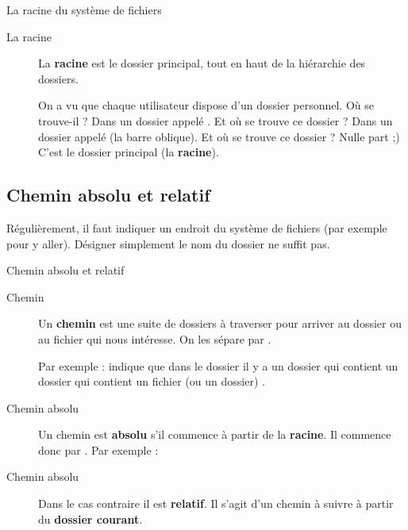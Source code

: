 \documentclass[a4paper,11pt]{style-esi/td}
\begin{document}
		\begin{theorie}{La racine du système de fichiers}
			\begin{description}
			\item[La racine]
				La \textbf{racine} est le dossier principal, 
				tout en haut de la hiérarchie des dossiers.

				On a vu que chaque utilisateur dispose d'un dossier personnel. 
				Où se trouve-il ? Dans un dossier appelé . 
				Et où se trouve ce dossier  ? 
				Dans un dossier appelé \og{}\samp{/}\fg{} (la barre oblique). 
				Et où se trouve ce dossier \og{}\samp{/}\fg{} ? Nulle part ;) 
				C'est le dossier principal (la \textbf{racine}).
			\end{description}
		\end{theorie}

	\subsection{Chemin absolu et relatif}

		
		\bigskip
		Régulièrement, il faut indiquer un endroit du système de fichiers 
		(par exemple pour y aller). 
		Désigner simplement le nom du dossier ne suffit pas.  

		\begin{theorie}{Chemin absolu et relatif}
			\begin{description}
			\item[Chemin]
				Un \textbf{chemin} est une suite de dossiers à traverser 
				pour arriver au dossier ou au fichier qui nous intéresse.
				On les sépare par \og{}\samp{/}\fg{}.

				Par exemple : 
				indique que dans le dossier 
				il y a un dossier 
				qui contient un dossier  
				qui contient un fichier (ou un dossier) .
			\item[Chemin absolu]
				Un chemin est \textbf{absolu} 
				s'il commence à partir de la \textbf{racine}.
				Il commence donc par \og{}\samp{/}\fg{}.
				Par exemple : 
			\item[Chemin absolu]
				Dans le cas contraire il est \textbf{relatif}.
				Il s'agit d'un chemin à suivre à partir du \textbf{dossier courant}.
			\end{description}
		\end{theorie}
\end{document}
